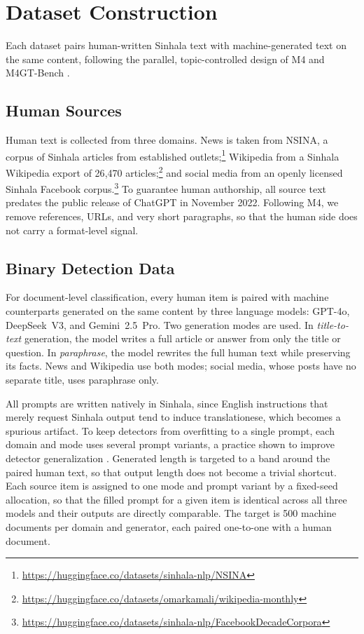 \documentclass[11pt]{article}
\begin{document}
\section{Dataset Construction}
\label{sec:data}

Each dataset pairs human-written Sinhala text with machine-generated text on the same content, following the parallel, topic-controlled design of M4 and M4GT-Bench \citep{wang-etal-2024-m4, wang-etal-2024-m4gt}.

\subsection{Human Sources}

Human text is collected from three domains. News is taken from NSINA, a corpus of Sinhala articles from established outlets;\footnote{\url{https://huggingface.co/datasets/sinhala-nlp/NSINA}} Wikipedia from a Sinhala Wikipedia export of 26{,}470 articles;\footnote{\url{https://huggingface.co/datasets/omarkamali/wikipedia-monthly}} and social media from an openly licensed Sinhala Facebook corpus.\footnote{\url{https://huggingface.co/datasets/sinhala-nlp/FacebookDecadeCorpora}} To guarantee human authorship, all source text predates the public release of ChatGPT in November 2022. Following M4, we remove references, URLs, and very short paragraphs, so that the human side does not carry a format-level signal.

\subsection{Binary Detection Data}

For document-level classification, every human item is paired with machine counterparts generated on the same content by three language models: GPT-4o, DeepSeek~V3, and Gemini~2.5~Pro. Two generation modes are used. In \emph{title-to-text} generation, the model writes a full article or answer from only the title or question. In \emph{paraphrase}, the model rewrites the full human text while preserving its facts. News and Wikipedia use both modes; social media, whose posts have no separate title, uses paraphrase only.

All prompts are written natively in Sinhala, since English instructions that merely request Sinhala output tend to induce translationese, which becomes a spurious artifact. To keep detectors from overfitting to a single prompt, each domain and mode uses several prompt variants, a practice shown to improve detector generalization \citep{hao-etal-2025-learning}. Generated length is targeted to a band around the paired human text, so that output length does not become a trivial shortcut. Each source item is assigned to one mode and prompt variant by a fixed-seed allocation, so that the filled prompt for a given item is identical across all three models and their outputs are directly comparable. The target is 500 machine documents per domain and generator, each paired one-to-one with a human document.
\end{document}
